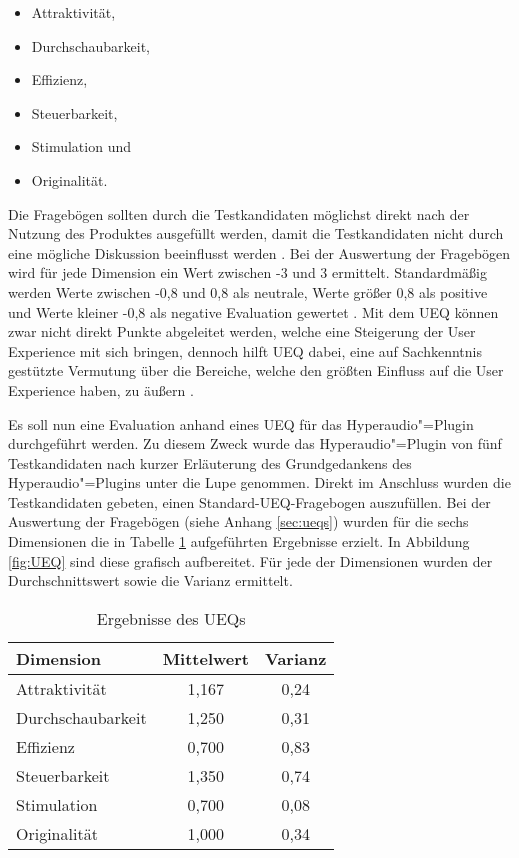 \begin{itemize}
\item Attraktivität,
\item Durchschaubarkeit,
\item Effizienz,
\item Steuerbarkeit,
\item Stimulation und
\item Originalität.
\end{itemize}

Die Fragebögen sollten durch die Testkandidaten möglichst direkt nach der Nutzung des Produktes ausgefüllt werden, damit die Testkandidaten nicht durch eine mögliche Diskussion beeinflusst werden \citep{schrepp2018user}. Bei der Auswertung der Fragebögen wird für jede Dimension ein Wert zwischen -3 und 3 ermittelt. Standardmäßig werden Werte zwischen -0,8 und 0,8 als neutrale, Werte größer 0,8 als positive und Werte kleiner -0,8 als negative Evaluation gewertet \citep{schrepp2018user}. Mit dem UEQ können zwar nicht direkt Punkte abgeleitet werden, welche eine Steigerung der User Experience mit sich bringen, dennoch hilft UEQ dabei, eine auf Sachkenntnis gestützte Vermutung über die Bereiche, welche den größten Einfluss auf die User Experience haben, zu äußern \citep{schrepp2018user}.

Es soll nun eine Evaluation anhand eines UEQ für das Hyperaudio"=Plugin durchgeführt werden. Zu diesem Zweck wurde das Hyperaudio"=Plugin von fünf Testkandidaten nach kurzer Erläuterung des Grundgedankens des Hyperaudio"=Plugins unter die Lupe genommen. Direkt im Anschluss wurden die Testkandidaten gebeten, einen Standard-UEQ-Fragebogen auszufüllen. Bei der Auswertung der Fragebögen (siehe Anhang \ref{sec:ueqs}) wurden für die sechs Dimensionen die in Tabelle \ref{tab:EvalUEQ} aufgeführten Ergebnisse erzielt. In Abbildung \ref{fig:UEQ} sind diese grafisch aufbereitet. Für jede der Dimensionen wurden der Durchschnittswert sowie die Varianz ermittelt.

\begin{table}[!ht]
\def\arraystretch{1.4}
\caption{Ergebnisse des UEQs}
\label{tab:EvalUEQ}
 \begin{tabularx}{\textwidth}{lcc}      
    \hline
    Dimension & Mittelwert & Varianz
    \\\hline
	Attraktivität & 1,167 & 0,24\\
	Durchschaubarkeit & 1,250 & 0,31\\
	Effizienz & 0,700 & 0,83\\
	Steuerbarkeit & 1,350 & 0,74\\
	Stimulation & 0,700 & 0,08\\
	Originalität & 1,000 & 0,34\\
    \hline
    \end{tabularx}
\end{table}

